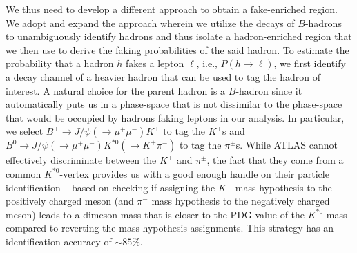 We thus need to develop a different approach to obtain a fake-enriched region. %
We adopt and expand the approach wherein we utilize the decays of $B$-hadrons to unambiguously identify hadrons and thus isolate a hadron-enriched region that we then use to derive the faking probabilities of the said hadron. %
To estimate the probability that a hadron $h$ fakes a lepton $\ell$, i.e., $P(h\to\ell)$, we first identify a decay channel of a heavier hadron that can be used to tag the hadron of interest. %
A natural choice for the parent hadron is a $B$-hadron since it automatically puts us in a phase-space that is not dissimilar to the phase-space that would be occupied by hadrons faking leptons in our analysis. 
In particular, we select $B^+\to J/\psi(\to \mu^+\mu^-)K^+$ to tag the $K^\pm$s and $B^0\to J/\psi(\to \mu^+\mu^-) K^{\ast 0}(\to K^+\pi^-)$ to tag the $\pi^\pm$s.
While ATLAS cannot effectively discriminate between the $K^\pm$ and $\pi^\pm$, the fact that they come from a common $K^{\ast 0}$-vertex provides us with a good enough handle on their particle identification -- based on checking if assigning the $K^+$ mass hypothesis to the positively charged meson (and $\pi^-$ mass hypothesis to the negatively charged meson) leads to a dimeson mass that is closer to the PDG value of the $K^{\ast 0}$ mass compared to reverting the mass-hypothesis assignments. This strategy has an identification accuracy of $\sim 85\%$. %
